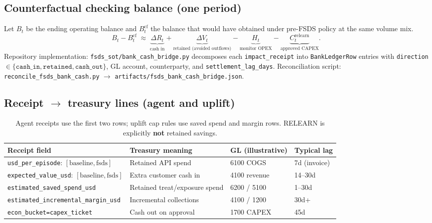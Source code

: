 \documentclass[11pt]{article}
\begin{document}
\subsection{Counterfactual checking balance (one period)}
Let $B_t$ be the ending operating balance and $B_t^{\mathrm{cf}}$ the balance that would have obtained under pre-FSDS policy at the same volume mix.
\begin{equation}
\label{eq:checking}
B_t - B_t^{\mathrm{cf}}
\;\approx\;
\underbrace{\Delta R_t}_{\text{cash in}}
+
\underbrace{\Delta V_t}_{\text{retained (avoided outflows)}}
-
\underbrace{H_t}_{\text{monitor OPEX}}
-
\underbrace{C_t^{\mathrm{relearn}}}_{\text{approved CAPEX}}.
\end{equation}
Repository implementation: \texttt{fsds\_sot/bank\_cash\_bridge.py} decomposes each \texttt{impact\_receipt} into \texttt{BankLedgerRow} entries with \texttt{direction}$\in\{\texttt{cash\_in},\texttt{retained},\texttt{cash\_out}\}$, GL account, counterparty, and \texttt{settlement\_lag\_days}.
Reconciliation script: \texttt{reconcile\_fsds\_bank\_cash.py} $\rightarrow$ \texttt{artifacts/fsds\_bank\_cash\_bridge.json}.

\subsection{Receipt $\rightarrow$ treasury lines (agent and uplift)}
\begin{table}[h]
\centering
\small
\begin{tabular}{@{}llll@{}}
\toprule
Receipt field & Treasury meaning & GL (illustrative) & Typical lag \\
\midrule
\texttt{usd\_per\_episode}: $[\text{baseline},\text{fsds}]$ & Retained API spend & 6100 COGS & 7d (invoice) \\
\texttt{expected\_value\_usd}: $[\text{baseline},\text{fsds}]$ & Extra customer cash in & 4100 revenue & 14--30d \\
\texttt{estimated\_saved\_spend\_usd} & Retained treat/exposure spend & 6200 / 5100 & 1--30d \\
\texttt{estimated\_incremental\_margin\_usd} & Incremental collections & 4100 / 1200 & 30d+ \\
\texttt{econ\_bucket=capex\_ticket} & Cash out on approval & 1700 CAPEX & 45d \\
\bottomrule
\end{tabular}
\caption{Agent receipts use the first two rows; uplift cap rules use saved spend and margin rows. RELEARN is explicitly \textbf{not} retained savings.}
\end{table}
\end{document}

